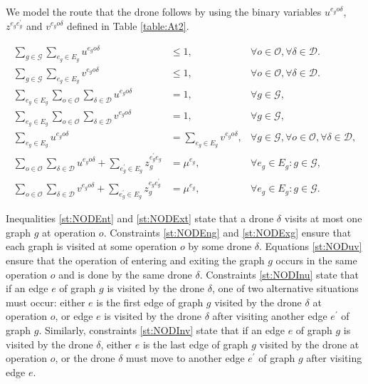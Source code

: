 \documentclass[10pt,a4paper]{elsarticle}
\newcommand{\EN}[1]{{\color{black}#1}}
\begin{document}
\noindent
We model the route that the drone follows by using the binary variables $u^{e_go\delta}$, $z^{e_ge^\prime_g}$ and $v^{e_go\delta}$ defined in Table \ref{table:At2}.

\begin{align}
	\sum_{g\in \mathcal G}\sum_{e_g\in E_g}  u^{e_go\delta} & \leq 1, &\forall o\in \mathcal O, \forall \delta\in\mathcal D.\label{st:NODEnt}\\
	\sum_{g\in \mathcal G}\sum_{e_g\in E_g}  v^{e_go\delta} & \leq 1, &\forall o\in \mathcal O, \forall \delta\in\mathcal D.\label{st:NODExt} \\
	\sum_{e_g\in E_g} \sum_{o\in \mathcal O} \sum_{\delta\in\mathcal D} u^{e_go\delta} & = 1, &\forall g\in\mathcal G, \label{st:NODEng}\\%
		\sum_{e_g\in E_g} \sum_{o\in \mathcal O} \sum_{\delta\in\mathcal D} v^{e_go\delta} & = 1, &\forall g\in\mathcal G, \label{st:NODExg}\\%
			\sum_{e_g\in E_g} u^{e_go\delta} & = \sum_{e_g\in E_g} v^{e_go\delta}, &\forall g\in\mathcal G, \forall o\in \mathcal O, \forall \delta\in\mathcal D, \label{st:NODuv}\\%
				\sum_{o\in \mathcal O} \sum_{\delta \in \mathcal D} u^{e_go\delta} + \sum_{e^\prime_g\in E_g} z_g^{e^\prime_ge_g} & = \mu^{e_g}, &\forall e_g\in E_g:g\in\mathcal G, \label{st:NODInu}\\
				\sum_{o\in \mathcal O} \sum_{\delta \in \mathcal D} v^{e_go\delta} + \sum_{e^\prime_g\in E_g} z_g^{e_ge^\prime_g} & = \mu^{e_g}, &\forall e_g\in E_g:g\in\mathcal G. \label{st:NODInv}
			\end{align}
			
			\noindent 
			Inequalities \eqref{st:NODEnt} and \eqref{st:NODExt} state that a drone $\delta$ visits at most one graph $g$ at operation $o$.  Constraints \eqref{st:NODEng} and \eqref{st:NODExg} \EN{ensure} that each graph is visited at some operation $o$ by some drone $\delta$. Equations \eqref{st:NODuv} ensure that the operation of entering and exiting the graph $g$ occurs in the same operation $o$ and is done by the same drone $\delta$. Constraints \eqref{st:NODInu} state that if an edge $e$ of graph $g$ is visited by the drone $\delta$, one of two alternative situations must occur: either $e$ is the first edge of graph $g$ visited by the drone $\delta$ at operation $o$, or edge $e$ is visited by the drone $\delta$ after visiting another edge $e^\prime$ of graph $g$. Similarly, constraints \eqref{st:NODInv} state that if an edge $e$ of graph $g$ is visited by the drone $\delta$, either $e$ is the last edge of graph $g$ visited by the drone at operation $o$, or the drone $\delta$ must move to another edge $e^\prime$ of graph $g$ after visiting edge $e$.
			
\end{document}
